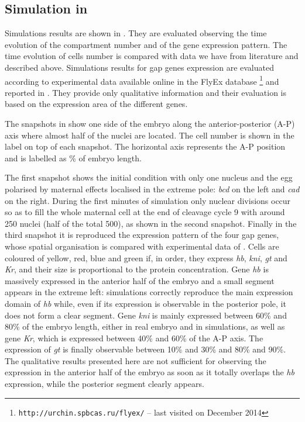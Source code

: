 \documentclass[12pt,a4paper,twoside,openright]{book}
\begin{document}
\subsection{Simulation in \alchemist{}}

Simulations results are shown in . They are evaluated observing the time evolution of the compartment number and of the gene expression pattern. 
%
The time evolution of cells number is compared with data we have from literature and described above.
%
Simulations results for gap genes expression are evaluated according to experimental data available online in the FlyEx database \cite{database-2008}\footnote{\texttt{http://urchin.spbcas.ru/flyex/} -- last visited on December 2014} and reported in . They provide only qualitative information and their evaluation is  based on the expression area of the different genes.

The snapshots  in  show one side of the embryo along the anterior-posterior (A-P) axis where almost half of the nuclei are located. The cell number is shown in the label on top of each snapshot. The horizontal axis represents the A-P position and  is labelled as \% of embryo length.

The first snapshot shows the initial condition with only one nucleus and the egg polarised by maternal effects localised in the extreme pole: \emph{bcd} on the left and \emph{cad} on the right.
%
During the first minutes of simulation only nuclear divisions occur so as to fill the whole maternal cell at the end of cleavage cycle 9 with around 250 nuclei (half of the total 500), as shown in the second snapshot. 
%
Finally in the third snapshot it is reproduced the expression pattern of the four gap genes, whose spatial organisation is compared with experimental data of . Cells are coloured  of yellow, red, blue and green if, in order, they express \emph{hb}, \emph{kni}, \emph{gt} and \emph{Kr}, and their size is proportional to the protein concentration.
%
Gene \emph{hb} is massively expressed in the anterior half of the embryo and a small segment appears in the extreme left: simulations correctly reproduce the main expression domain of \emph{hb} while, even if its expression is observable in the posterior pole, it does not form a clear segment.
%
Gene  \emph{kni} is mainly expressed between 60\% and 80\% of the embryo length, either in real embryo and in simulations,
%
as well as gene  \emph{Kr}, which is expressed between 40\% and 60\% of the A-P axis.
%
The expression of  \emph{gt} is finally observable between 10\% and 30\% and 80\% and 90\%. The qualitative results presented here are not sufficient for observing the expression in the anterior half of the embryo as soon as it totally overlaps the \emph{hb} expression, while the posterior segment clearly appears.
%
\end{document}
